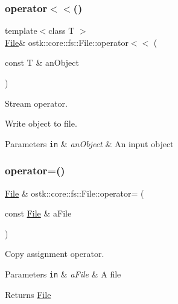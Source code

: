 \subsubsection{\texorpdfstring{operator$<$$<$()}{operator<<()}}
{\footnotesize\ttfamily template$<$class T $>$ \\
\hyperlink{classostk_1_1core_1_1fs_1_1_file}{File}\& ostk\+::core\+::fs\+::\+File\+::operator$<$$<$ (\begin{DoxyParamCaption}\item[{const T \&}]{an\+Object }\end{DoxyParamCaption})\hspace{0.3cm}{\ttfamily [inline]}}



Stream operator. 

Write object to file.


\begin{DoxyParams}[1]{Parameters}
\mbox{\tt in}  & {\em an\+Object} & An input object \\
\hline
\end{DoxyParams}
\mbox{\label{classostk_1_1core_1_1fs_1_1_file_a497eeaad4b643dc25856e2dcfdda49c4}} 
\subsubsection{\texorpdfstring{operator=()}{operator=()}}
{\footnotesize\ttfamily \hyperlink{classostk_1_1core_1_1fs_1_1_file}{File} \& ostk\+::core\+::fs\+::\+File\+::operator= (\begin{DoxyParamCaption}\item[{const \hyperlink{classostk_1_1core_1_1fs_1_1_file}{File} \&}]{a\+File }\end{DoxyParamCaption})}



Copy assignment operator. 


\begin{DoxyParams}[1]{Parameters}
\mbox{\tt in}  & {\em a\+File} & A file \\
\hline
\end{DoxyParams}
\begin{DoxyReturn}{Returns}
\hyperlink{classostk_1_1core_1_1fs_1_1_file}{File} 
\end{DoxyReturn}
\mbox{\label{classostk_1_1core_1_1fs_1_1_file_a293348f9363e8b7544b684ffd12a63f8}} 
